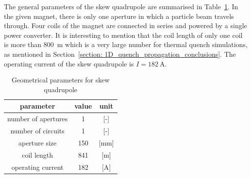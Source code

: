 The general parameters of the skew quadrupole are summarised in Table~\ref{table:skew_quad_params_table}. In the given magnet, there is only one aperture in which a particle beam travels through. Four coils of the magnet are connected in series and powered by a single power converter. It is interesting to mention that the coil length of only one coil is more than 800~m which is a very large number for thermal quench simulations, as mentioned in Section~\ref{section: 1D_quench_propagation_conclusions}. The operating current of the skew quadrupole is $I=182~\text{A}$.

\begin{table}[H]
    \caption{Geometrical parameters for skew quadrupole \cite{marco_prioli_mails, hl_lhc_tech_design_report_v01}} 
    \vspace{-1.em} 
    \fontsize{10}{10}
    \selectfont 
    \renewcommand{\arraystretch}{1.5}
    \begin{center}
    \begin{tabular}{ ccc }  
    \hline
    parameter & value & unit \\
    \hline
    number of apertures & 1 & [-] \\
    number of circuits & 1 & [-] \\
    aperture size & 150 & [mm]\\
    coil length & 841 & [m] \\
    operating current & 182 & [A] \\
    \hline 
    \end{tabular}
    \end{center}  
     \label{table:skew_quad_params_table} 
 \end{table}